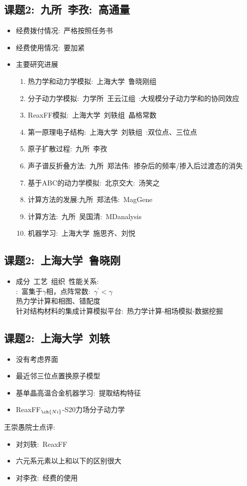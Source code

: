 \documentclass[10pt,a4paper]{article}
\begin{document}
\subsection{课题2:~九所~李孜:~高通量}
\begin{itemize}
	\item 经费拨付情况:~严格按照任务书
	\item 经费使用情况:~要加紧
	\item 主要研究进展
		\begin{enumerate}
			\item 热力学和动力学模拟:~上海大学~鲁晓刚组
			\item 分子动力学模拟:~力学所~王云江组~:大规模分子动力学和的协同效应
			\item \textrm{ReaxFF}模拟:~上海大学~刘轶组~晶格常数
			\item 第一原理电子结构:~上海大学~刘轶组~:双位点、三位点
			\item 原子扩散过程:~九所~李孜
			\item 声子谱反折叠方法:~九所~郑法伟:~掺杂后的频率/掺入后过渡态的消失
			\item 基于\textrm{ABC}的动力学模拟:~北京交大:~汤笑之
			\item 计算方法的发展:九所~郑法伟:~MagGene
			\item 计算方法:~九所~吴国清:~MDanalysis
			\item 机器学习:~上海大学~施思齐、刘悦
		\end{enumerate}
\end{itemize}

\subsection{课题2:~上海大学~鲁晓刚}
\begin{itemize}
	\item 成分~工艺~组织~性能关系:\\
		:~富集于$\gamma$相，点阵常数:~$\gamma^{\prime}<\gamma$\\
		热力学计算和相图、错配度\\
		针对结构材料的集成计算模拟平台:~热力学计算-相场模拟-数据挖掘
\end{itemize}
\subsection{课题2:~上海大学~刘轶}
\begin{itemize}
	\item 没有考虑界面
	\item 最近邻三位点置换原子模型
	\item {}基单晶高温合金机器学习:~提取结构特征
	\item \textrm{ReaxFF}$_{\ch{Ni}}$-\textrm{S}20力场分子动力学
\end{itemize}
王崇愚院士点评:~
\begin{itemize}
	\item 对刘轶:~\textrm{ReaxFF}
	\item 六元系元素以上和以下的区别很大
	\item 对李孜:~经费的使用
\end{itemize}
\end{document}
